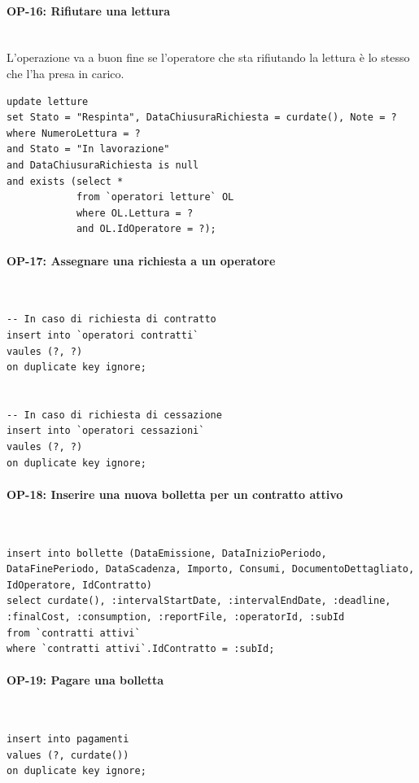 \documentclass[a4paper,12pt]{report}
\begin{document}
\paragraph{OP-16: Rifiutare una lettura}\mbox{}\\
L'operazione va a buon fine se l'operatore che sta rifiutando la lettura è lo stesso che l'ha presa in carico.
\begin{lstlisting}
update letture
set Stato = "Respinta", DataChiusuraRichiesta = curdate(), Note = ?
where NumeroLettura = ?
and Stato = "In lavorazione"
and DataChiusuraRichiesta is null
and exists (select *
            from `operatori letture` OL
            where OL.Lettura = ?
            and OL.IdOperatore = ?);
\end{lstlisting}

\paragraph{OP-17: Assegnare una richiesta a un operatore}\mbox{}\\
\begin{lstlisting}
-- In caso di richiesta di contratto
insert into `operatori contratti`
vaules (?, ?)
on duplicate key ignore;


-- In caso di richiesta di cessazione
insert into `operatori cessazioni`
vaules (?, ?)
on duplicate key ignore;
\end{lstlisting}
    
\paragraph{OP-18: Inserire una nuova bolletta per un contratto attivo}\mbox{}\\
\begin{lstlisting}
insert into bollette (DataEmissione, DataInizioPeriodo, DataFinePeriodo, DataScadenza, Importo, Consumi, DocumentoDettagliato, IdOperatore, IdContratto)
select curdate(), :intervalStartDate, :intervalEndDate, :deadline, :finalCost, :consumption, :reportFile, :operatorId, :subId
from `contratti attivi`
where `contratti attivi`.IdContratto = :subId;
\end{lstlisting}

\paragraph{OP-19: Pagare una bolletta}\mbox{}\\
\begin{lstlisting}
insert into pagamenti
values (?, curdate())
on duplicate key ignore;
\end{lstlisting}
\end{document}
